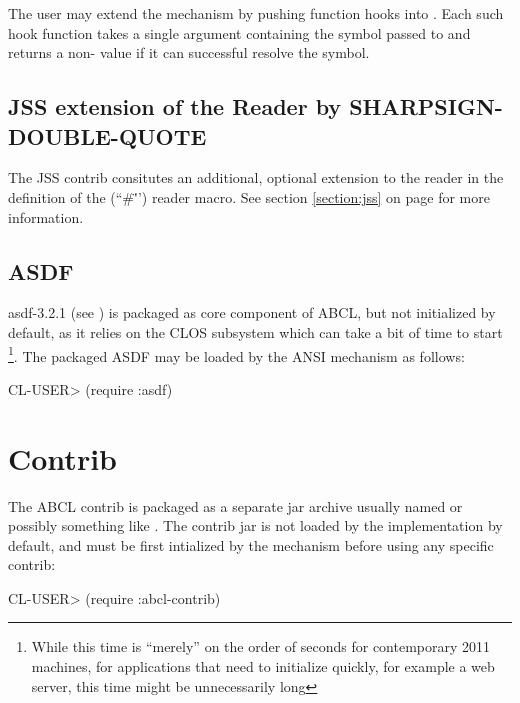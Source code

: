 \documentclass[10pt]{book}
\begin{document}
The user may extend the  mechanism by pushing
function hooks into .  Each
such hook function takes a single argument containing the symbol
passed to  and returns a non- value if it
can successful resolve the symbol.

\section{JSS extension of the Reader by SHARPSIGN-DOUBLE-QUOTE}

The JSS contrib consitutes an additional, optional extension to the
reader in the definition of the 
(``\#\"'') reader macro.  See section \ref{section:jss} on page
\pageref{section:jss} for more information.

\section{ASDF}

asdf-3.2.1 (see \cite{asdf}) is packaged as core component of \textsc{ABCL},
but not initialized by default, as it relies on the \textsc{CLOS} subsystem
which can take a bit of time to start \footnote{While this time is
  ``merely'' on the order of seconds for contemporary 2011 machines,
  for applications that need to initialize quickly, for example a web
  server, this time might be unnecessarily long}.  The packaged \textsc{ASDF}
may be loaded by the \textsc{ANSI}  mechanism as
follows:

\begin{listing-lisp}
CL-USER> (require :asdf)
\end{listing-lisp}

\chapter{Contrib}

The \textsc{ABCL} contrib is packaged as a separate jar archive usually named
 or possibly something like
.  The contrib jar is not loaded by the
implementation by default, and must be first intialized by the
 mechanism before using any specific contrib:

\begin{listing-lisp}
CL-USER> (require :abcl-contrib)
\end{listing-lisp}
\end{document}
